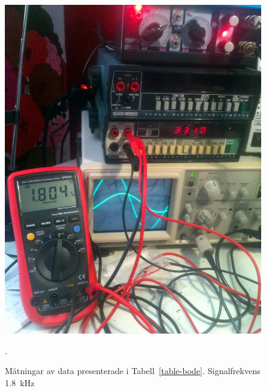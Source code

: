 \begin{figure}
  \centering
  \includegraphics[width=\linewidth]{img/bode_1800Hz.jpg}
  \caption[] {Mätningar av data presenterade i Tabell~\ref{table-bode}.
              Signalfrekvens \SI{1.8}{\kHz}}.
  \label{fig:bode-foto-1800}
\end{figure}


